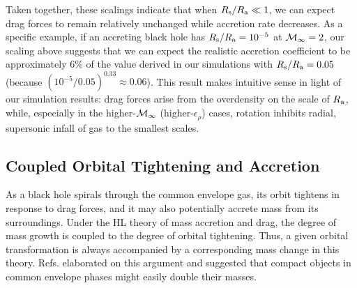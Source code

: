 Taken together, these scalings indicate that when $R_{\rm s}/R_{\rm a} \ll 1$, we can expect drag forces to remain relatively unchanged while accretion rate decreases. As a specific example, if an accreting black hole has $R_{\rm s}/R_{\rm a}=10^{-5}$ at ${\cal M}_\infty=2$, our scaling above suggests that we can expect the realistic accretion coefficient to be approximately 6\% of the value derived in our simulations with $R_{\rm s}/R_{\rm a}=0.05$ (because $(10^{-5}/0.05)^{0.33}\approx 0.06$).  This result makes intuitive sense in light of our simulation results: drag forces arise from the overdensity on the scale of $R_{\rm a}$, while, especially in the higher-${\cal M}_{\infty}$ (higher-$\epsilon_\rho$) cases, rotation inhibits radial, supersonic infall of gas to the smallest scales.  

\vspace*{2.5mm}
\subsection{Coupled Orbital Tightening and Accretion}\label{sec:coupled}
As a black hole spirals through the common envelope gas, its orbit tightens in response to drag forces, and it may also potentially accrete mass from its surroundings. Under the HL theory of mass accretion and drag, the degree of mass growth is coupled to the degree of orbital tightening. Thus, a given orbital transformation is always accompanied by a corresponding mass change in this theory. Refs. \cite{Chevalier:1993,Brown:1995,Bethe:1998} elaborated on this argument and suggested that compact objects in common envelope phases might easily double their masses. 

